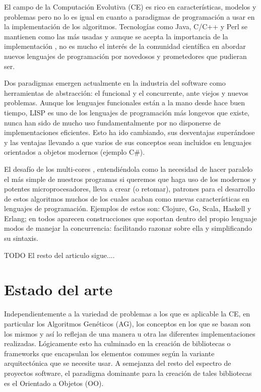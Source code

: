 \documentclass[runningheads]{llncs}
\begin{document}
\noindent El campo de la Computación Evolutiva (CE) es rico en características, modelos y problemas pero no lo es igual en cuanto a paradigmas de programación a usar en la implementación de los algoritmos. Tecnologías como Java, C/C++ y Perl se mantienen como las más usadas y aunque se acepta la importancia de la implementación \cite{DBLP:conf/iwann/MereloRACML11}, no es mucho el interés de la comunidad científica en abordar nuevos lenguajes de programación por novedosos y prometedores que pudieran ser.

Dos paradigmas emergen actualmente en la industria del software como herramientas de abstracción: el funcional y el concurrente, ante viejos y nuevos problemas. Aunque los lenguajes funcionales están a la mano desde hace buen tiempo, LISP es uno de los lenguajes de programación más longevos que existe, nunca han sido de mucho uso fundamentalmente por no disponerse de implementaciones eficientes. Esto ha ido cambiando, sus desventajas superándose y las ventajas llevando a que varios de sus conceptos sean incluidos en lenguajes orientados a objetos modernos (ejemplo C\#).

El desafío de los multi-cores \cite{SutterL05}, entendiéndola como la necesidad de hacer paralelo el más simple de nuestros programas si queremos que haga uso de los modernos y potentes microprocesadores, lleva a crear (o retomar), patrones para el desarrollo de estos algoritmos muchos de los cuales acaban como nuevas características en lenguajes de programación. Ejemplos de estos son: Clojure, Go, Scala, Haskell y Erlang; en todos aparecen construcciones que soportan dentro del propio lenguaje modos de manejar la concurrencia: facilitando razonar sobre ella y simplificando su sintaxis.

TODO
El resto del articulo sigue....



\section{Estado del arte}
\label{sec:fprog2ae}

Independientemente a la variedad de problemas a los que es aplicable la CE, en particular los Algoritmos Genéticos (AG), los conceptos en los que se basan son los mismos y así lo reflejan de una manera u otra las diferentes implementaciones realizadas. Lógicamente esto ha culminado en la creación de bibliotecas o frameworks que encapsulan los elementos comunes según la variante arquitectónica que se necesite usar. A semejanza del resto del espectro de proyectos software, el paradigma dominante para la creación de tales bibliotecas es el Orientado a Objetos (OO).
\end{document}
